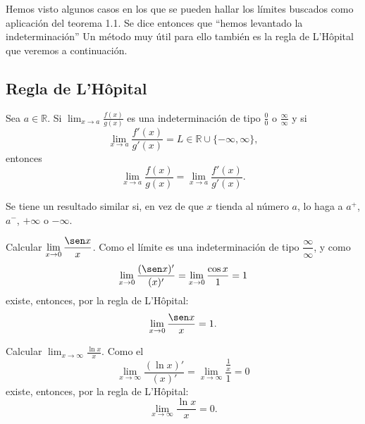 Hemos visto algunos casos en los que se pueden hallar los límites buscados como aplicación del
teorema 1.1. Se dice entonces que ``hemos levantado la indeterminación'' Un método muy útil para
ello también es la regla de L'H\^{o}pital que veremos a continuación.


\subsection{Regla de L'H\^{o}pital}

\begin{teocal}
Sea $a\in \mathbb{R}$. Si $\displaystyle\lim_{x\rightarrow a}\frac{f(x)}{g(x)}$ es una indeterminación de tipo $\frac{0}{0}$ o $\frac{\infty}{\infty}$ y si
\begin{equation*}
	\lim_{x\rightarrow a}\frac{f'(x)}{g'(x)}=L\in \mathbb{R}\cup \{-\infty, \infty\},
\end{equation*}
entonces
\begin{equation*}
	\lim_{x\rightarrow a}\frac{f(x)}{g(x)}=\lim_{x\rightarrow a}\frac{f'(x)}{g'(x)}.
\end{equation*}
\end{teocal}

Se tiene un resultado similar si, en vez de que $x$ tienda al número $a$, lo haga a $a^+$, $a^-$,
$+\infty$ o $-\infty$.

\begin{exemplo}[Solución]{%
Calcular $\displaystyle\lim_{x\rightarrow 0}\frac{\sen x}{x}$.
}%
Como el límite es una indeterminación de tipo $\dfrac{\infty}{\infty}$, y como
\begin{equation*}
	\lim_{x\rightarrow 0}\frac{(\sen x)'}{(x)'}=\lim_{x\rightarrow 0}\frac{\cos x}{1} = 1
\end{equation*}
existe, entonces, por la regla de L'H\^{o}pital:
\begin{equation*}
	\lim_{x\rightarrow 0}\frac{\sen x}{x}=1.
\end{equation*}
\end{exemplo}

\begin{exemplo}[Solución]{
Calcular $\displaystyle\lim_{x\rightarrow \infty}\frac{\ln x}{x}$.
}%
Como el
\begin{equation*}
	\lim_{x\rightarrow \infty}\frac{(\ln x)'}{(x)'}=\lim_{x\rightarrow \infty}\frac{\frac{1}{x}}{1} = 0
\end{equation*}
existe, entonces, por la regla de L'H\^{o}pital:
\begin{equation*}
	\lim_{x\rightarrow \infty}\frac{\ln x}{x}=0.
\end{equation*}
\end{exemplo}

